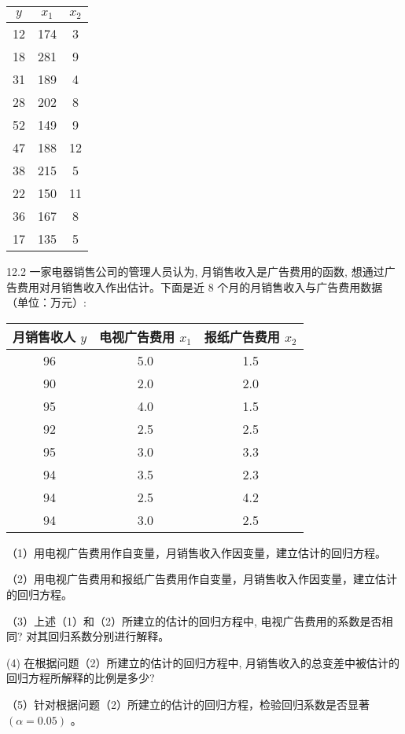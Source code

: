 \documentclass[10pt]{article}
\begin{document}
\begin{CJK*}{UTF8}{bsmi}
\begin{center}
\begin{tabular}{ccc}
\hline
$y$ & $x_{1}$ & $x_{2}$ \\
\hline
12 & 174 & 3 \\
18 & 281 & 9 \\
31 & 189 & 4 \\
28 & 202 & 8 \\
52 & 149 & 9 \\
47 & 188 & 12 \\
38 & 215 & 5 \\
22 & 150 & 11 \\
36 & 167 & 8 \\
17 & 135 & 5 \\
\hline
\end{tabular}
\end{center}

12.2 一家电器销售公司的管理人员认为, 月销售收入是广告费用的函数, 想通过广告费用对月销售收入作出估计。下面是近 8 个月的月销售收入与广告费用数据（单位：万元）:

\begin{center}
\begin{tabular}{ccc}
\hline
月销售收人 $y$ & 电视广告费用 $x_{1}$ & 报纸广告费用 $x_{2}$ \\
\hline
96 & 5.0 & 1.5 \\
90 & 2.0 & 2.0 \\
95 & 4.0 & 1.5 \\
92 & 2.5 & 2.5 \\
95 & 3.0 & 3.3 \\
94 & 3.5 & 2.3 \\
94 & 2.5 & 4.2 \\
94 & 3.0 & 2.5 \\
\hline
\end{tabular}
\end{center}

（1）用电视广告费用作自变量，月销售收入作因变量，建立估计的回归方程。

（2）用电视广告费用和报纸广告费用作自变量，月销售收入作因变量，建立估计的回归方程。

（3）上述（1）和（2）所建立的估计的回归方程中, 电视广告费用的系数是否相同? 对其回归系数分别进行解释。

(4) 在根据问题（2）所建立的估计的回归方程中, 月销售收入的总变差中被估计的回归方程所解释的比例是多少?

（5）针对根据问题（2）所建立的估计的回归方程，检验回归系数是否显著 $(\alpha=0.05)$ 。


\end{CJK*}
\end{document}

